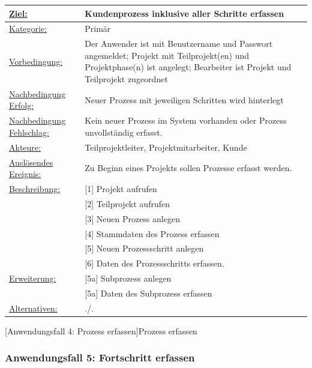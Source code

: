 \label{tab:UC4}
\begin{tabularx}{\textwidth}{|p{}|p{}|}
        \hline
        \underline{Ziel:} & Kundenprozess inklusive aller Schritte erfassen \\\hline
        \underline{Kategorie:} & Primär\\\hline
        \underline{Vorbedingung:} & Der Anwender ist mit Benutzername und Passwort angemeldet; Projekt mit Teilprojekt(en) und Projektphase(n) ist angelegt; Bearbeiter ist Projekt und Teilprojekt zugeordnet\\\hline
        \underline{Nachbedingung Erfolg:} & Neuer Prozess mit jeweiligen Schritten wird hinterlegt \\\hline
        \underline{Nachbedingung Fehlschlag:} & Kein neuer Prozess im System vorhanden oder Prozess unvollständig erfasst. \\\hline
        \underline{Akteure:} & Teilprojektleiter, Projektmitarbeiter, Kunde\\\hline
        \underline{Auslösendes Ereignis:} & Zu Beginn eines Projekts sollen Prozesse erfasst werden.\\\hline        
        \multirow{1}{*}{\underline{Beschreibung:}} & [1] Projekt aufrufen\\
        & [2] Teilprojekt aufrufen\\
        & [3] Neuen Prozess anlegen\\
        & [4] Stammdaten des Prozess erfassen\\
        & [5] Neuen Prozessschritt anlegen\\
        & [6] Daten des Prozessschritts erfassen.\\\hline
        \multirow{1}{*}{\underline{Erweiterung:}} & [5a] Subprozess anlegen\\
        & [5a] Daten des Subprozess erfassen\\\hline
        \underline{Alternativen:} & ./. \\\hline
\end{tabularx}
[Anwendungsfall 4: Prozess erfassen]{Prozess erfassen}


\newpage
\subsubsection{Anwendungsfall 5: Fortschritt erfassen}


